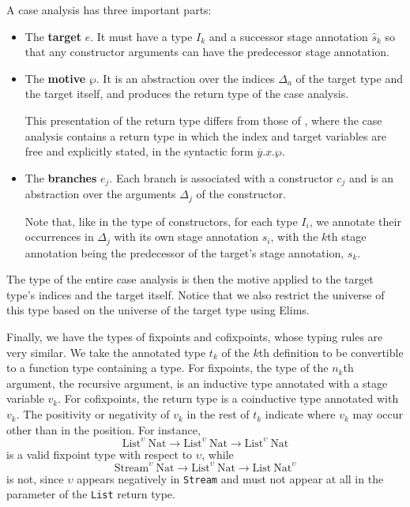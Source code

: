 \documentclass[sigplan,10pt,anonymous,review]{acmart}
\begin{document}
A case analysis has three important parts:
\begin{itemize}
    \item The \textbf{target} $e$. It must have a \coinductive type $I_k$ and a successor stage annotation $\hat{s}_k$ so that any constructor arguments can have the predecessor stage annotation.
    \item The \textbf{motive} $\wp$. It is an abstraction over the indices $\Delta_a$ of the target type and the target itself, and produces the return type of the case analysis.
    
    This presentation of the return type differs from those of \cite{cic-hat-bar, cic-hat-l, cc-hat-omega}, where the case analysis contains a return type in which the index and target variables are free and explicitly stated, in the syntactic form $\overline{y}.x.\wp$.
    \item The \textbf{branches} $e_j$. Each branch is associated with a constructor $c_j$ and is an abstraction over the arguments $\Delta_j$ of the constructor.
    
    Note that, like in the type of constructors, for each \coinductive type $I_i$, we annotate their occurrences in $\Delta_j$ with its own stage annotation $s_i$, with the $k$th stage annotation being the predecessor of the target's stage annotation, $s_k$.
\end{itemize}
The type of the entire case analysis is then the motive applied to the target type's indices and the target itself. Notice that we also restrict the universe of this type based on the universe of the target type using Elims.

Finally, we have the types of fixpoints and cofixpoints, whose typing rules are very similar. We take the annotated type $t_k$ of the $k$th \cofixpoint definition to be convertible to a function type containing a \coinductive type. For fixpoints, the type of the $n_k$th argument, the recursive argument, is an inductive type annotated with a stage variable $v_k$. For cofixpoints, the return type is a coinductive type annotated with $v_k$. The positivity or negativity of $v_k$ in the rest of $t_k$ indicate where $v_k$ may occur other than in the \corecursive position. For instance,
\begin{equation*}
\text{List}^\upsilon\ \text{Nat} \to \text{List}^\upsilon\ \text{Nat} \to \text{List}^\upsilon\ \text{Nat}
\end{equation*}
is a valid fixpoint type with respect to $\upsilon$, while
\begin{equation*}
\text{Stream}^\upsilon\ \text{Nat} \to \text{List}^\upsilon\ \text{Nat} \to \text{List}\ \text{Nat}^\upsilon
\end{equation*}
is not, since $\upsilon$ appears negatively in \texttt{Stream} and must not appear at all in the parameter of the \texttt{List} return type.
\end{document}
